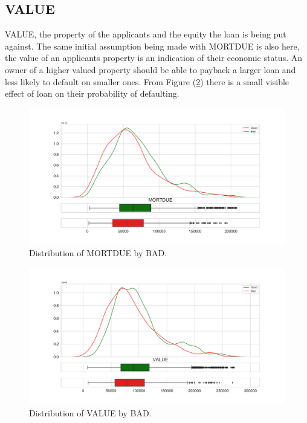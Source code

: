 \subsection*{VALUE}

VALUE,  the property of the applicants and the equity the loan is being put against. The same initial assumption being made with MORTDUE is also here, the value of an applicants property is an indication of their economic status. An owner of a higher valued property should be able to payback a larger loan and less likely to default on smaller ones. From Figure (\ref{value_dist}) there is a small visible effect of loan on their probability of defaulting.

\begin{figure}[H]
	\centering
	\includegraphics[scale=0.40]{figs/mortdue_dist.pdf}
	\caption{Distribution of MORTDUE by BAD. \label{mortdue_dist}}
\end{figure}

\begin{figure}[H]
	\centering
	\includegraphics[scale=0.40]{figs/value_dist.pdf}
	\caption{Distribution of VALUE by BAD. \label{value_dist}}
\end{figure}

